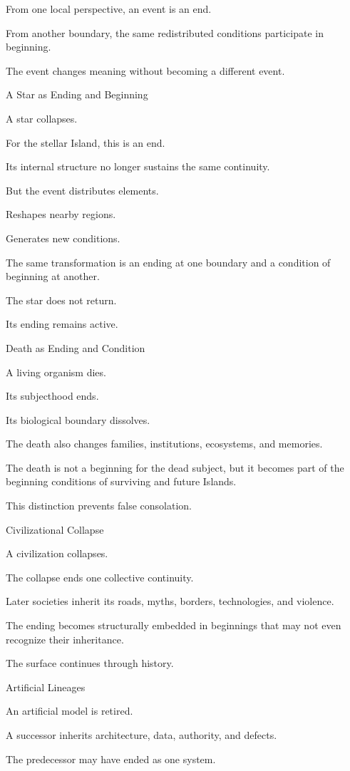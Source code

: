 From one local perspective, an event is an end.

From another boundary, the same redistributed conditions participate in beginning.

The event changes meaning without becoming a different event.

A Star as Ending and Beginning

A star collapses.

For the stellar Island, this is an end.

Its internal structure no longer sustains the same continuity.

But the event distributes elements.

Reshapes nearby regions.

Generates new conditions.

The same transformation is an ending at one boundary and a condition of beginning at another.

The star does not return.

Its ending remains active.

Death as Ending and Condition

A living organism dies.

Its subjecthood ends.

Its biological boundary dissolves.

The death also changes families, institutions, ecosystems, and memories.

The death is not a beginning for the dead subject, but it becomes part of the beginning conditions of surviving and future Islands.

This distinction prevents false consolation.

Civilizational Collapse

A civilization collapses.

The collapse ends one collective continuity.

Later societies inherit its roads, myths, borders, technologies, and violence.

The ending becomes structurally embedded in beginnings that may not even recognize their inheritance.

The surface continues through history.

Artificial Lineages

An artificial model is retired.

A successor inherits architecture, data, authority, and defects.

The predecessor may have ended as one system.

